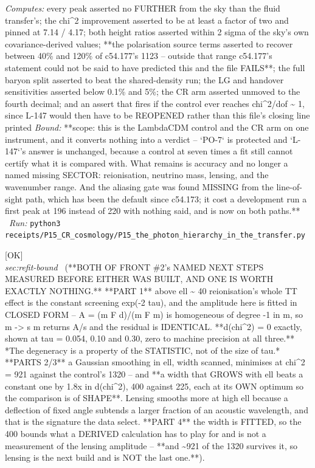 \begin{description}
\emph{Computes:} every peak asserted no FURTHER from the sky than the fluid transfer's; the chi\textasciicircum{}2 improvement asserted to be at least a factor of two and pinned at 7.14 / 4.17; both height ratios asserted within 2 sigma of the sky's own covariance-derived values; **the polarisation source terms asserted to recover between 40\% and 120\% of c54.177's 1123 -- outside that range c54.177's statement could not be said to have predicted this and the file FAILS**; the full baryon split asserted to beat the shared-density run; the LG and handover sensitivities asserted below 0.1\% and 5\%; the CR arm asserted unmoved to the fourth decimal; and an assert that fires if the control ever reaches chi\textasciicircum{}2/dof \textasciitilde{} 1, since L-147 would then have to be REOPENED rather than this file's closing line printed
 \emph{Bound:} **scope: this is the LambdaCDM control and the CR arm on one instrument, and it converts nothing into a verdict -- `PO-7` is protected and `L-147`'s answer is unchanged, because a control at seven times a fit still cannot certify what it is compared with. What remains is accuracy and no longer a named missing SECTOR: reionisation, neutrino mass, lensing, and the wavenumber range. And the aliasing gate was found MISSING from the line-of-sight path, which has been the default since c54.173; it cost a development run a first peak at 196 instead of 220 with nothing said, and is now on both paths.**
\ \emph{Run:} \texttt{python3 receipts/P15\_CR\_cosmology/P15\_the\_photon\_hierarchy\_in\_the\_transfer.py}
\item[\label{rcpt:P15_what_is_left_is_lensing_and_not_reionisation}\texttt{P15\_what\_is\_left\_is\_lensing\_and\_not\_reionisation}]\hfill\textsf{[OK]}\\
\textit{sec:refit-bound} \ (**BOTH OF FRONT \#2's NAMED NEXT STEPS MEASURED BEFORE EITHER WAS BUILT, AND ONE IS WORTH EXACTLY NOTHING.** **PART 1** above ell \textasciitilde{} 40 reionisation's whole TT effect is the constant screening exp(-2 tau), and the amplitude here is fitted in CLOSED FORM -- A = (m F d)/(m F m) is homogeneous of degree -1 in m, so m -> s m returns A/s and the residual is IDENTICAL. **d(chi\textasciicircum{}2) = 0 exactly, shown at tau = 0.054, 0.10 and 0.30, zero to machine precision at all three.** *The degeneracy is a property of the STATISTIC, not of the size of tau.* **PARTS 2/3** a Gaussian smoothing in ell, width scanned, minimises at chi\textasciicircum{}2 = 921 against the control's 1320 -- and **a width that GROWS with ell beats a constant one by 1.8x in d(chi\textasciicircum{}2), 400 against 225, each at its OWN optimum so the comparison is of SHAPE**. Lensing smooths more at high ell because a deflection of fixed angle subtends a larger fraction of an acoustic wavelength, and that is the signature the data select. **PART 4** the width is FITTED, so the 400 bounds what a DERIVED calculation has to play for and is not a measurement of the lensing amplitude -- **and \textasciitilde{}921 of the 1320 survives it, so lensing is the next build and is NOT the last one.**). 

\end{description}
